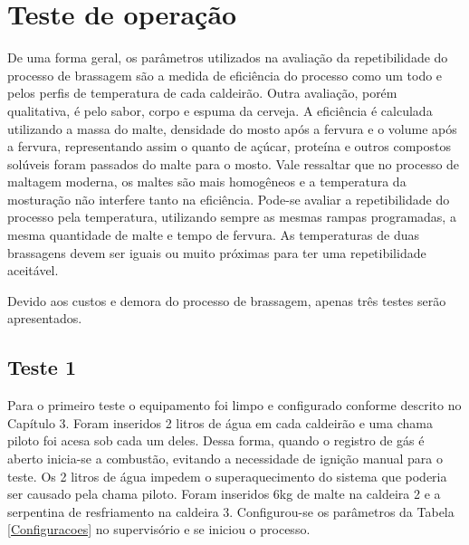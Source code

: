 	\chapter{Teste de operação}
De uma forma geral, os parâmetros utilizados na avaliação da repetibilidade do processo de brassagem são a medida de eficiência do processo como um todo e pelos perfis de temperatura de cada caldeirão. Outra avaliação, porém qualitativa, é pelo sabor, corpo e espuma da cerveja. A eficiência é calculada utilizando a massa do malte, densidade do mosto após a fervura e o volume após a fervura, representando assim o quanto de açúcar, proteína e outros compostos solúveis foram passados do malte para o mosto. Vale ressaltar que no processo de maltagem moderna, os maltes são mais homogêneos e a temperatura da mosturação não interfere tanto na eficiência. Pode-se avaliar a repetibilidade do processo pela temperatura, utilizando sempre as mesmas rampas programadas, a mesma quantidade de malte e tempo de fervura. As temperaturas de duas brassagens devem ser iguais ou muito próximas para ter uma repetibilidade aceitável. 

Devido aos custos e demora do processo de brassagem, apenas três testes serão apresentados.

	\section{Teste 1}
Para o primeiro teste o equipamento foi limpo e configurado conforme descrito no Capítulo 3. Foram inseridos 2 litros de água em cada caldeirão e uma chama piloto foi acesa sob cada um deles. Dessa forma, quando o registro de gás é aberto inicia-se a combustão, evitando a necessidade de ignição manual para o teste. Os 2 litros de água impedem o superaquecimento do sistema que poderia ser causado pela chama piloto. Foram inseridos 6kg de malte na caldeira 2 e a serpentina de resfriamento na caldeira 3. Configurou-se os parâmetros da Tabela \ref{Configuracoes} no supervisório e se iniciou o processo. 

